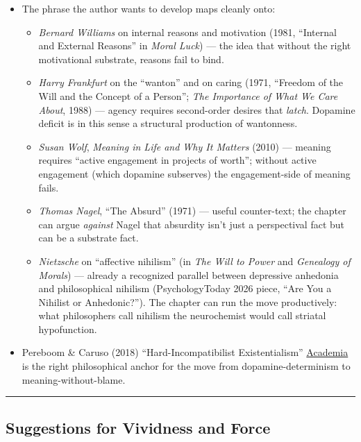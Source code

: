 \begin{itemize}
\tightlist
\item
  The phrase the author wants to develop maps cleanly onto:

  \begin{itemize}
  \tightlist
  \item
    \emph{Bernard Williams} on internal reasons and motivation (1981, ``Internal and External Reasons'' in \emph{Moral Luck}) --- the idea that without the right motivational substrate, reasons fail to bind.
  \item
    \emph{Harry Frankfurt} on the ``wanton'' and on caring (1971, ``Freedom of the Will and the Concept of a Person''; \emph{The Importance of What We Care About}, 1988) --- agency requires second-order desires that \emph{latch}. Dopamine deficit is in this sense a structural production of wantonness.
  \item
    \emph{Susan Wolf}, \emph{Meaning in Life and Why It Matters} (2010) --- meaning requires ``active engagement in projects of worth''; without active engagement (which dopamine subserves) the engagement-side of meaning fails.
  \item
    \emph{Thomas Nagel}, ``The Absurd'' (1971) --- useful counter-text; the chapter can argue \emph{against} Nagel that absurdity isn't just a perspectival fact but can be a substrate fact.
  \item
    \emph{Nietzsche} on ``affective nihilism'' (in \emph{The Will to Power} and \emph{Genealogy of Morals}) --- already a recognized parallel between depressive anhedonia and philosophical nihilism (PsychologyToday 2026 piece, ``Are You a Nihilist or Anhedonic?''). The chapter can run the move productively: what philosophers call nihilism the neurochemist would call striatal hypofunction.
  \end{itemize}
\item
  Pereboom \& Caruso (2018) ``Hard-Incompatibilist Existentialism'' \href{https://cornell.academia.edu/DerkPereboom}{Academia} is the right philosophical anchor for the move from dopamine-determinism to meaning-without-blame.
\end{itemize}

\begin{center}\rule{0.5\linewidth}{0.5pt}\end{center}

\subsection{Suggestions for Vividness and Force}\label{07_pleasure_and_self-suggestions-for-vividness-and-force}

